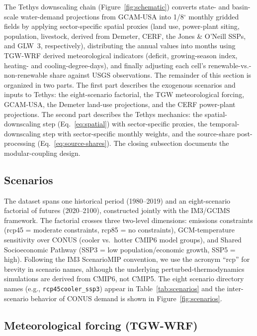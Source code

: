 \documentclass[fleqn,10pt]{wlscirep}
\providecommand{\DIFadd}[1]{{\protect\color{blue}\uwave{#1}}} %
\providecommand{\DIFaddbegin}{} %
\providecommand{\DIFaddend}{} %
\begin{document}
The Tethys downscaling chain (Figure~\ref{fig:schematic}) converts state- and basin-scale water-demand projections from GCAM-USA into 1/8$^{\circ}$ monthly gridded fields by applying sector-specific spatial proxies (land use, power-plant siting, population, livestock, derived from Demeter, CERF, the Jones \& O'Neill SSPs, and GLW~3, respectively), distributing the annual values into months using TGW-WRF derived meteorological indicators (deficit, growing-season index, heating- and cooling-degree-days), and finally adjusting each cell's renewable-vs.-non-renewable share against USGS observations. The remainder of this section is organized in two parts. The first part describes the exogenous scenarios and inputs to Tethys: the eight-scenario factorial, the TGW meteorological forcing, GCAM-USA, the Demeter land-use projections, and the CERF power-plant projections. The second part describes the Tethys mechanics: the spatial-downscaling step (Eq.~\ref{eq:spatial}) with sector-specific proxies, the temporal-downscaling step with sector-specific monthly weights, and the source-share post-processing (Eq.~\ref{eq:source-shares}). The closing subsection documents the modular-coupling design.

\subsection*{Scenarios}

The dataset spans one historical period (1980--2019) and an eight-scenario factorial of futures (2020--2100), constructed jointly with the IM3/GCIMS framework\cite{Mongird2025CERF}. The factorial crosses three two-level dimensions: emissions constraints (rcp45 = moderate constraints, rcp85 = no constraints), GCM-temperature sensitivity over CONUS (cooler vs.\ hotter CMIP6 model groups), and Shared Socioeconomic Pathway (SSP3 = low population/economic growth, SSP5 = high). Following the IM3 ScenarioMIP convention, we use the acronym ``rcp'' for brevity in scenario names, although the underlying perturbed-thermodynamics simulations are derived from CMIP6, not CMIP5\cite{Mongird2025CERF}. The eight scenario directory names (e.g., \texttt{rcp45cooler\_ssp3}) appear in Table~\ref{tab:scenarios} and the inter-scenario behavio\DIFaddbegin \DIFadd{u}\DIFaddend r of CONUS demand is shown in Figure~\ref{fig:scenarios}.

\subsection*{Meteorological forcing (TGW-WRF)}
\end{document}
